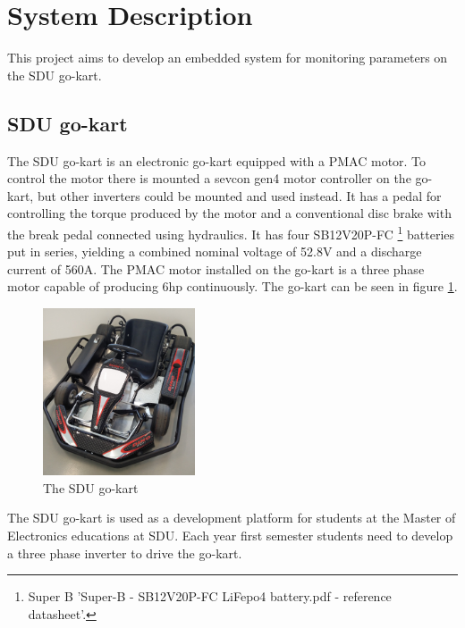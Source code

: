 \section{System Description}
\label{sec:system_description}
This project aims to develop an embedded system for monitoring parameters on the SDU go-kart.

\subsection{SDU go-kart}
The SDU go-kart is an electronic go-kart equipped with a PMAC motor. 
To control the motor there is mounted a sevcon gen4 motor controller on the go-kart, but other inverters could be mounted and used instead.
It has a pedal for controlling the torque produced by the motor and a conventional disc brake with the break pedal connected using hydraulics.
It has four SB12V20P-FC \footnote{Super B 'Super-B - SB12V20P-FC LiFepo4 battery.pdf - reference datasheet'.} batteries put in series, yielding a combined nominal voltage of 52.8V and a discharge current of 560A.
The PMAC motor installed on the go-kart is a three phase motor capable of producing 6hp continuously.
The go-kart can be seen in figure \ref{fig:go_kart}.

\begin{figure}[h]
 	\centering
    \includegraphics[width=0.4\textwidth]{graphics/go_kart}
    \caption{The SDU go-kart}
    \label{fig:go_kart}
\end{figure}

The SDU go-kart is used as a development platform for students at the Master of Electronics educations at SDU.
Each year first semester students need to develop a three phase inverter to drive the go-kart.

